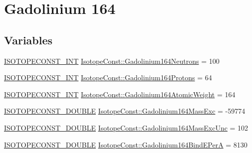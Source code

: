 \hypertarget{group___isotope_const-_gadolinium-_gd164}{}\section{Gadolinium 164}
\label{group___isotope_const-_gadolinium-_gd164}
\subsection*{Variables}
\begin{DoxyCompactItemize}
\item 
\mbox{\hyperlink{group___isotope_const-_macros_ga5f18360b3e99483a35c32d789e62621c}{I\+S\+O\+T\+O\+P\+E\+C\+O\+N\+S\+T\+\_\+\+I\+NT}} \mbox{\hyperlink{group___isotope_const-_gadolinium-_gd164_ga00834124d3a0f0e3a585cb8b35ff6942}{Isotope\+Const\+::\+Gadolinium164\+Neutrons}} = 100
\item 
\mbox{\hyperlink{group___isotope_const-_macros_ga5f18360b3e99483a35c32d789e62621c}{I\+S\+O\+T\+O\+P\+E\+C\+O\+N\+S\+T\+\_\+\+I\+NT}} \mbox{\hyperlink{group___isotope_const-_gadolinium-_gd164_ga1b2d25132b2e5e0bd081a748221f94dd}{Isotope\+Const\+::\+Gadolinium164\+Protons}} = 64
\item 
\mbox{\hyperlink{group___isotope_const-_macros_ga5f18360b3e99483a35c32d789e62621c}{I\+S\+O\+T\+O\+P\+E\+C\+O\+N\+S\+T\+\_\+\+I\+NT}} \mbox{\hyperlink{group___isotope_const-_gadolinium-_gd164_gaad37dcafb584edacff11c0dcb8f560c4}{Isotope\+Const\+::\+Gadolinium164\+Atomic\+Weight}} = 164
\item 
\mbox{\hyperlink{group___isotope_const-_macros_ga8f45a7272ce02c0b4c65c44636ed719a}{I\+S\+O\+T\+O\+P\+E\+C\+O\+N\+S\+T\+\_\+\+D\+O\+U\+B\+LE}} \mbox{\hyperlink{group___isotope_const-_gadolinium-_gd164_gaf66f3c3d7a3893f4efc839efea727d9b}{Isotope\+Const\+::\+Gadolinium164\+Mass\+Exc}} = -\/59774
\item 
\mbox{\hyperlink{group___isotope_const-_macros_ga8f45a7272ce02c0b4c65c44636ed719a}{I\+S\+O\+T\+O\+P\+E\+C\+O\+N\+S\+T\+\_\+\+D\+O\+U\+B\+LE}} \mbox{\hyperlink{group___isotope_const-_gadolinium-_gd164_ga14234b987f25b096fd36524bfac5066d}{Isotope\+Const\+::\+Gadolinium164\+Mass\+Exc\+Unc}} = 102
\item 
\mbox{\hyperlink{group___isotope_const-_macros_ga8f45a7272ce02c0b4c65c44636ed719a}{I\+S\+O\+T\+O\+P\+E\+C\+O\+N\+S\+T\+\_\+\+D\+O\+U\+B\+LE}} \mbox{\hyperlink{group___isotope_const-_gadolinium-_gd164_gaa3f93172037ecab71f9e17b75f0c0ed5}{Isotope\+Const\+::\+Gadolinium164\+Bind\+E\+PerA}} = 8130
\item 

\end{DoxyCompactItemize}

